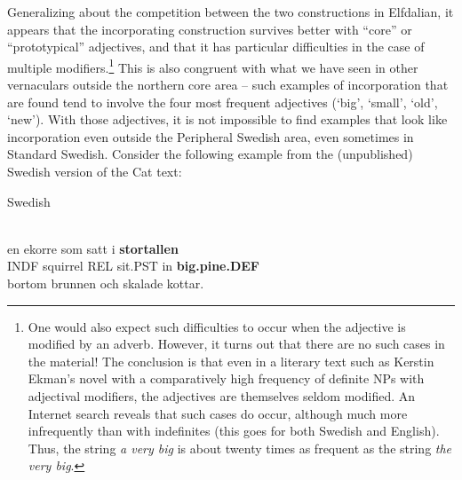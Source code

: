 Generalizing about the competition between the two constructions in Elfdalian, it appears that the incorporating construction survives better with “core” or “prototypical” adjectives, and that it has particular difficulties in the case of multiple modifiers.\footnote{ One would also expect such difficulties to occur when the adjective is modified by an adverb. However, it turns out that there are no such cases in the material! The conclusion is that even in a literary text such as Kerstin Ekman’s novel with a comparatively high frequency of definite NPs with adjectival modifiers, the adjectives are themselves seldom modified. An Internet search reveals that such cases do occur, although much more infrequently than with indefinites (this goes for both Swedish and English). Thus, the string \textit{a very big} is about twenty times as frequent as the string \textit{the very big}.} This is also congruent with what we have seen in other vernaculars outside the northern core area – such examples of incorporation that are found tend to involve the four most frequent adjectives (‘big’, ‘small’, ‘old’, ‘new’). With those adjectives, it is not impossible to find examples that look like incorporation even outside the Peripheral Swedish area, even sometimes in Standard Swedish. Consider the following example from the (unpublished) Swedish version of the Cat text:


\item 

Swedish



 \ea\label{}
\\

 \ea\label{}
\gll en  ekorre  som  satt  i  \textbf{stortallen}\\


INDF  squirrel  REL  sit.PST  in  \textbf{big.pine.DEF}\\

 \ea\label{}
\gll bortom  brunnen  och  skalade  kottar.\\


